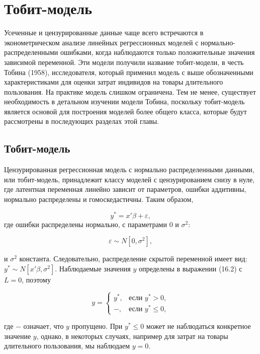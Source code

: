 \section{Тобит-модель}

Усеченные и цензурированные данные чаще всего встречаются в эконометрическом анализе линейных регрессионных моделей с нормально-распределенными ошибками, когда наблюдаются только положительные значения зависимой переменной. Эти модели получили название тобит-модели, в честь Тобина (1958), исследователя, который применил модель с выше обозначенными характеристиками для оценки затрат индивидов на товары длительного пользования. На практике модель слишком ограничена. Тем не менее, существует необходимость в детальном изучении модели Тобина, поскольку тобит-модель является основой для построения моделей более общего класса, которые будут рассмотрены в последующих разделах этой главы.

\subsection{Тобит-модель}

Цензурированная регрессионная модель с нормально распределенными данными, или тобит-модель, принадлежит классу моделей с цензурированием снизу в нуле, где латентная переменная линейно зависит от параметров, ошибки аддитивны, нормально распределены и гомоскедастичны. Таким образом, 

\begin{equation}
 y^* =x'\beta+\varepsilon,
\end{equation}
где ошибки распределены нормально, с параметрами $0$ и $\sigma^2$:

\begin{equation}
\varepsilon{\sim}N[0,\sigma^2],
\end{equation}

и $\sigma^2$ константа. Следовательно, распределение скрытой переменной имеет вид: $y^*  \sim N[x'\beta,\sigma^2]$. Наблюдаемые значения $y$ определены в выражении (16.2) с $L=0$, поэтому 

\begin{equation}
y=
\begin{cases}
y^* , &\text{если } y^* >0, \\
-, & \text{если } y^*  \leq 0,
\end{cases}
\end{equation}

где $-$ означает, что $y$ пропущено. При $y^*\leq 0$ может не наблюдаться конкретное значение $y$, однако, в некоторых случаях, например для затрат на товары длительного пользования, мы наблюдаем $y=0$. 

